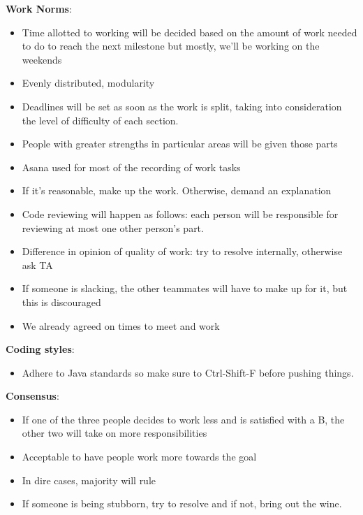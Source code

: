 \documentclass[12pt]{book}
\begin{document}
\bigskip

{\bf Work Norms}:
\begin{itemize}
\item Time allotted to working will be decided based on the amount of work needed to do to reach the next milestone but mostly, we'll be working on the weekends
\item Evenly distributed, modularity
\item  Deadlines will be set as soon as the work is split, taking into consideration the level of difficulty of each section.
\item People with greater strengths in particular areas will be given those parts
\item  Asana used for most of the recording of work tasks
\item If it’s reasonable, make up the work. Otherwise, demand an explanation
\item  Code reviewing will happen as follows: each person will be responsible for reviewing at most one other person’s part.
\item  Difference in opinion of quality of work: try to resolve internally, otherwise ask TA
\item  If someone is slacking, the other teammates will have to make up for it, but this is discouraged
\item  We already agreed on times to meet and work
\end{itemize}


\bigskip
{\bf Coding styles}:
\begin{itemize}
\item  Adhere to Java standards so make sure to Ctrl-Shift-F before pushing things. 
\end{itemize}


\bigskip
{\bf Consensus}:
\begin{itemize}
\item  If one of the three people decides to work less and is satisfied with a B, the other two will take on more responsibilities

\item  Acceptable to have people work more towards the goal

\item  In dire cases, majority will rule

\item  If someone is being stubborn, try to resolve and if not, bring out the wine.
\end{itemize}





\bigskip
\end{document}
